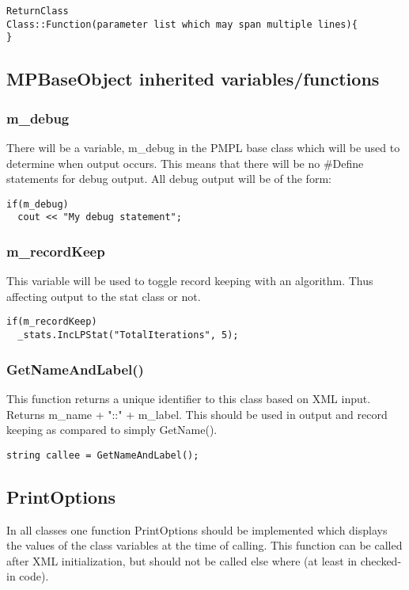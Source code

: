 \documentclass[12pt]{article}
\begin{document}
\begin{lstlisting}
ReturnClass
Class::Function(parameter list which may span multiple lines){
}
\end{lstlisting}

\subsection{MPBaseObject inherited variables/functions}
\subsubsection{m\_debug}
There will be a variable, m\_debug in the PMPL base class which will be used to determine when output occurs. This means
that there will be no \#Define statements for debug output. All debug output will be of the form:

\begin{lstlisting}
if(m_debug) 
  cout << "My debug statement";
\end{lstlisting}

\subsubsection{m\_recordKeep}
This variable will be used to toggle record keeping with an algorithm. Thus affecting output to the stat class or not.

\begin{lstlisting}
if(m_recordKeep) 
  _stats.IncLPStat("TotalIterations", 5);
\end{lstlisting}

\subsubsection{GetNameAndLabel()}
This function returns a unique identifier to this class based on XML input. Returns m\_name + "::" + m\_label. This
should be used in output and record keeping as compared to simply GetName().

\begin{lstlisting}
string callee = GetNameAndLabel();
\end{lstlisting}

\subsection{PrintOptions}
In all classes one function PrintOptions should be implemented which displays the values of the class variables at the
time of calling. This function can be called after XML initialization, but should not be called else where (at least in
checked-in code).
\end{document}
